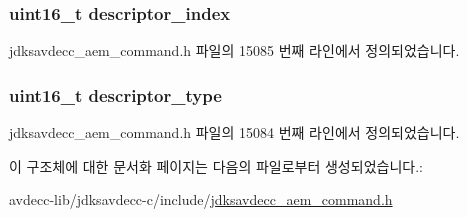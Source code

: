 \subsubsection[{\texorpdfstring{descriptor\+\_\+index}{descriptor_index}}]{\setlength{\rightskip}{0pt plus 5cm}uint16\+\_\+t descriptor\+\_\+index}\hypertarget{structjdksavdecc__aem__command__get__sampling__rate_a042bbc76d835b82d27c1932431ee38d4}{}\label{structjdksavdecc__aem__command__get__sampling__rate_a042bbc76d835b82d27c1932431ee38d4}


jdksavdecc\+\_\+aem\+\_\+command.\+h 파일의 15085 번째 라인에서 정의되었습니다.

\subsubsection[{\texorpdfstring{descriptor\+\_\+type}{descriptor_type}}]{\setlength{\rightskip}{0pt plus 5cm}uint16\+\_\+t descriptor\+\_\+type}\hypertarget{structjdksavdecc__aem__command__get__sampling__rate_ab7c32b6c7131c13d4ea3b7ee2f09b78d}{}\label{structjdksavdecc__aem__command__get__sampling__rate_ab7c32b6c7131c13d4ea3b7ee2f09b78d}


jdksavdecc\+\_\+aem\+\_\+command.\+h 파일의 15084 번째 라인에서 정의되었습니다.



이 구조체에 대한 문서화 페이지는 다음의 파일로부터 생성되었습니다.\+:\begin{DoxyCompactItemize}
\item 
avdecc-\/lib/jdksavdecc-\/c/include/\hyperlink{jdksavdecc__aem__command_8h}{jdksavdecc\+\_\+aem\+\_\+command.\+h}\end{DoxyCompactItemize}
